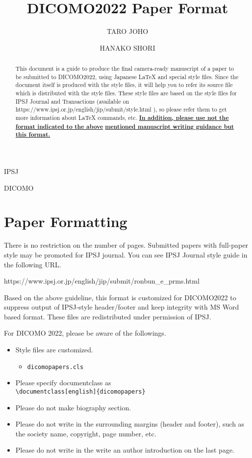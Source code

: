 \documentclass[English]{dicomopapers}
\def\|{\verb|}
\begin{document}
\title{DICOMO2022 Paper Format}



\author{TARO JOHO}{IPSJ}
\author{HANAKO SHORI}{DICOMO}

\begin{abstract}
This document is a guide to produce the final camera-ready manuscript
of a paper to be submitted to DICOMO2022, using Japanese {\LaTeX} and
special style files. Since the document itself is produced with the
style files, it will help you to refer its source file which is
distributed with the style files. These style files are based on the
style files for IPSJ Journal and Transactions (available on
https://www.ipsj.or.jp/english/jip/submit/style.html ), so please refer
them to get more information about {\LaTeX} commands, etc.
{\bf \underline{In addition, please use not the format indicated to the
  above}}
{\bf \underline{mentioned manuscript writing guidance but this format. }}
\end{abstract}

\maketitle

%1
\section{Paper Formatting}
There is no restriction on the number of pages. Submitted papers
with full-paper style may be promoted for IPSJ journal.
You can see IPSJ Journal style guide in
the following URL\cite{webpage}.

\noindent
https://www.ipsj.or.jp/english/jip/submit/ronbun\_e\_prms.html

Based on the above guideline, this format is customized for DICOMO2022
to suppress output of IPSJ-style header/footer and keep integrity with
MS Word based format.
These files are redistributed under permission of IPSJ.

For DICOMO 2022, please be aware of the followings.
\begin{itemize}
 \item Style files are customized.
       \begin{itemize}%{
	\item[]\tt dicomopapers.cls
       \end{itemize}%}
 \item Please specify documentclass as\\
      \|\documentclass[english]{dicomopapers}|
 \item Please do not make biography section.
 \item Please do not write in the surrounding margins (header and footer), such as the society name, copyright, page number, etc.
 \item Please do not write in the write an author introduction on the last page.
\end{itemize}
\end{document}
